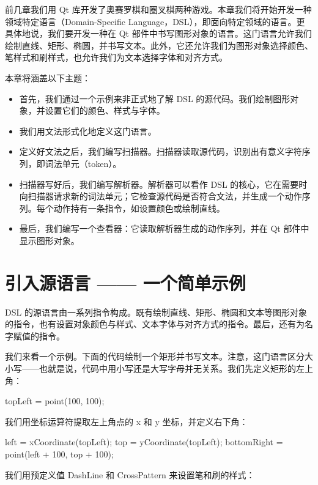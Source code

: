 \renewcommand{\codeInset}{63bp}
前几章我们用 Qt 库开发了奥赛罗棋和圈叉棋两种游戏。本章我们将开始开发一种领域特定语言（Domain-Specific Language，DSL），即面向特定领域的语言。更具体地说，我们要开发一种在 Qt 部件中书写图形对象的语言。这门语言允许我们绘制直线、矩形、椭圆，并书写文本。此外，它还允许我们为图形对象选择颜色、笔样式和刷样式，也允许我们为文本选择字体和对齐方式。

本章将涵盖以下主题：

\begin{itemize}
\item 首先，我们通过一个示例来非正式地了解 DSL 的源代码。我们绘制图形对象，并设置它们的颜色、样式与字体。
\item 我们用文法形式化地定义这门语言。
\item 定义好文法之后，我们编写扫描器。扫描器读取源代码，识别出有意义字符序列，即词法单元（token）。
\item 扫描器写好后，我们编写解析器。解析器可以看作 DSL 的核心，它在需要时向扫描器请求新的词法单元；它检查源代码是否符合文法，并生成一个动作序列。每个动作持有一条指令，如设置颜色或绘制直线。
\item 最后，我们编写一个查看器：它读取解析器生成的动作序列，并在 Qt 部件中显示图形对象。
\end{itemize}

\section{引入源语言 —— 一个简单示例}

DSL 的源语言由一系列指令构成。既有绘制直线、矩形、椭圆和文本等图形对象的指令，也有设置对象颜色与样式、文本字体与对齐方式的指令。最后，还有为名字赋值的指令。

我们来看一个示例。下面的代码绘制一个矩形并书写文本。注意，这门语言区分大小写——也就是说，代码中用小写还是大写字母并无关系。我们先定义矩形的左上角：

\begin{codebox}
topLeft = point(100, 100);
\end{codebox}

我们用坐标运算符提取左上角点的 x 和 y 坐标，并定义右下角：

\begin{codebox}
left = xCoordinate(topLeft);
top = yCoordinate(topLeft);
bottomRight = point(left + 100, top + 100);
\end{codebox}

我们用预定义值 DashLine 和 CrossPattern 来设置笔和刷的样式：

